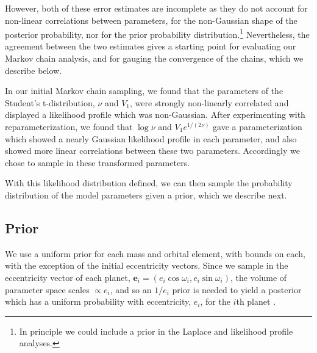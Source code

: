 \documentclass[fleqn,usenatbib]{mnras} %
\begin{document}
However, both of these error estimates are incomplete as they
do not account for non-linear correlations between parameters, for the non-Gaussian shape of the posterior probability, 
nor for the prior probability distribution.\footnote{In principle we could include a prior in the Laplace and likelihood profile analyses.}
Nevertheless, the agreement between the two estimates gives
a starting point for evaluating our Markov chain analysis, and
for gauging the convergence of the chains, which we describe below.

In our initial Markov chain sampling, we found that the parameters of the Student's t-distribution, $\nu$ and $V_1$, were strongly non-linearly correlated and displayed a likelihood profile which was non-Gaussian.   After experimenting with reparameterization, we found that $\log{\nu}$ and $V_1 e^{1/(2\nu)}$ gave a parameterization which showed a nearly Gaussian likelihood profile in each parameter, and also showed more linear correlations between these two parameters.  Accordingly we chose to sample in these transformed parameters.

With this likelihood distribution
defined, we can then sample the probability distribution of
the model parameters given a prior, which we describe next.

\subsection{Prior}

We use a uniform prior for each mass and orbital element,
with bounds on each, with the exception of the initial eccentricity vectors.
Since we sample in the eccentricity vector of each planet, $\mathbf{e}_i = (e_i\cos{\omega_i},e_i\sin{\omega_i})$, the volume
of parameter space scales $\propto e_i$, and so an $1/e_i$ prior is needed to
yield a posterior which has a uniform probability with eccentricity, $e_i$,
for the $i$th planet
\citep{Eastman2013}.  
\end{document}
